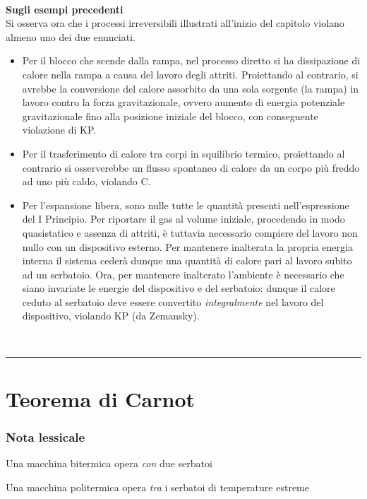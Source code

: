 \documentclass[10pt, oneside]{book}
\newcommand{\infobox}[2]{\vspace{0.5cm}~\\ \textbf{#1} \hrulefill \vspace{0.2cm}\\#2 {}\,\\\hrule \vspace{0.5cm}}
\begin{document}
\infobox{Sugli esempi precedenti}{Si osserva ora che i processi irreversibili illustrati all'inizio del capitolo violano almeno uno dei due enunciati.
\begin{itemize}
\item Per il blocco che scende dalla rampa, nel processo diretto si ha dissipazione di calore nella rampa a causa del lavoro degli attriti. Proiettando al contrario, si avrebbe la conversione del calore assorbito da una sola sorgente (la rampa) in lavoro contro la forza gravitazionale, ovvero aumento di energia potenziale gravitazionale fino alla posizione iniziale del blocco, con conseguente violazione di KP.
\item Per il trasferimento di calore tra corpi in squilibrio termico, proiettando al contrario si osserverebbe un flusso spontaneo di calore da un corpo più freddo ad uno più caldo, violando C.
\item Per l'espansione libera, sono nulle tutte le quantità presenti nell'espressione del I Principio. Per riportare il gas al volume iniziale, procedendo in modo quasistatico e assenza di attriti, è tuttavia necessario compiere del lavoro non nullo con un dispositivo esterno. Per mantenere inalterata la propria energia interna il sistema cederà dunque una quantità di calore pari al lavoro subito ad un serbatoio. Ora, per mantenere inalterato l'ambiente è necessario che siano invariate le energie del dispositivo e del serbatoio: dunque il calore ceduto al serbatoio deve essere convertito \textit{integralmente} nel lavoro del dispositivo, violando KP (da Zemansky).
\end{itemize}
}

\section{Teorema di Carnot}
\subsubsection*{Nota lessicale}
\begin{description}
\item Una macchina bitermica opera \textit{con} due serbatoi
\item Una macchina politermica opera \textit{tra} i serbatoi di temperature estreme
\end{description}
\end{document}

